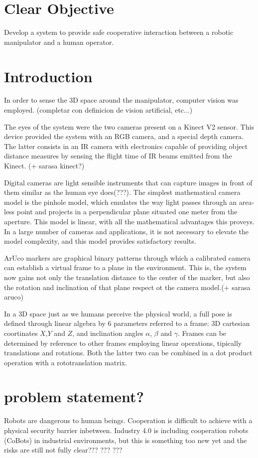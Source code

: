 \documentclass[12pt,a4paper,titlepage]{article}
\begin{document}
\section{Clear Objective}
Develop a system to provide safe cooperative interaction between a robotic manipulator and a human operator.

\section{Introduction}
In order to sense the 3D space around the manipulator, computer vision was employed. (completar con definicion de vision artificial, etc...)

The eyes of the system were the two cameras present on a Kinect V2 sensor. This device provided the system with an RGB camera, and a special depth camera. The latter consists in an IR camera with electronics capable of providing object distance measures by sensing the flight time of IR beams emitted from the Kinect. (+ sarasa kinect?)

Digital cameras are light sensible instruments that can capture images in front of them similar as the human eye does(???). The simplest mathematical camera model is the pinhole model, which emulates the way light passes through an area-less point and projects in a perpendicular plane situated one meter from the aperture. This model is linear, with all the mathematical advantages this proveys. In a large number of cameras and applications, it is not necessary to elevate the model complexity, and this model provides satisfactory results.

ArUco markers are graphical binary patterns through which a calibrated camera can establish a virtual frame to a plane in the environment. This is, the system now gains not only the translation distance to the center of the marker, but also the rotation and inclination of that plane respect ot the camera model.(+ sarasa aruco)

In a 3D space just as we humans perceive the physical world, a full pose is defined through linear algebra by 6 parameters referred to a frame: 3D cartesian coortinates $X$,$Y$ and $Z$, and inclination angles $\alpha$, $\beta$ and $\gamma$. 
Frames can be determined by reference to other frames employing linear operations, tipically translations and rotations. Both the latter two can be combined in a dot product operation with a rototranslation matrix.

\section{problem statement?}
Robots are dangerous to human beings. 
Cooperation is difficult to achieve with a physical security barrier inbetween.
Industry 4.0 is including cooperation robots (CoBots) in industrial environments, but this is something too new yet and the risks are still not fully clear???
???
???
\end{document}
